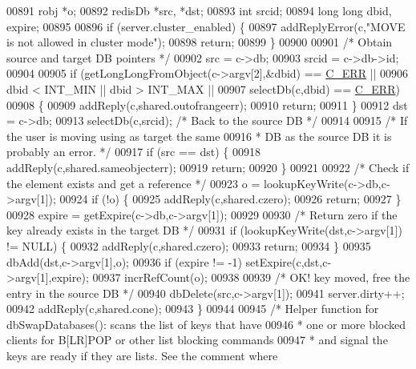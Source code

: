 \begin{DoxyCode}
00891     robj *o;
00892     redisDb *src, *dst;
00893     \textcolor{keywordtype}{int} srcid;
00894     \textcolor{keywordtype}{long} \textcolor{keywordtype}{long} dbid, expire;
00895 
00896     \textcolor{keywordflow}{if} (server.cluster\_enabled) \{
00897         addReplyError(c,\textcolor{stringliteral}{"MOVE is not allowed in cluster mode"});
00898         \textcolor{keywordflow}{return};
00899     \}
00900 
00901     \textcolor{comment}{/* Obtain source and target DB pointers */}
00902     src = c->db;
00903     srcid = c->db->id;
00904 
00905     \textcolor{keywordflow}{if} (getLongLongFromObject(c->argv[2],&dbid) == \hyperlink{server_8h_af98ac28d5f4d23d7ed5985188e6fb7d1}{C\_ERR} ||
00906         dbid < INT\_MIN || dbid > INT\_MAX ||
00907         selectDb(c,dbid) == \hyperlink{server_8h_af98ac28d5f4d23d7ed5985188e6fb7d1}{C\_ERR})
00908     \{
00909         addReply(c,shared.outofrangeerr);
00910         \textcolor{keywordflow}{return};
00911     \}
00912     dst = c->db;
00913     selectDb(c,srcid); \textcolor{comment}{/* Back to the source DB */}
00914 
00915     \textcolor{comment}{/* If the user is moving using as target the same}
00916 \textcolor{comment}{     * DB as the source DB it is probably an error. */}
00917     \textcolor{keywordflow}{if} (src == dst) \{
00918         addReply(c,shared.sameobjecterr);
00919         \textcolor{keywordflow}{return};
00920     \}
00921 
00922     \textcolor{comment}{/* Check if the element exists and get a reference */}
00923     o = lookupKeyWrite(c->db,c->argv[1]);
00924     \textcolor{keywordflow}{if} (!o) \{
00925         addReply(c,shared.czero);
00926         \textcolor{keywordflow}{return};
00927     \}
00928     expire = getExpire(c->db,c->argv[1]);
00929 
00930     \textcolor{comment}{/* Return zero if the key already exists in the target DB */}
00931     \textcolor{keywordflow}{if} (lookupKeyWrite(dst,c->argv[1]) != NULL) \{
00932         addReply(c,shared.czero);
00933         \textcolor{keywordflow}{return};
00934     \}
00935     dbAdd(dst,c->argv[1],o);
00936     \textcolor{keywordflow}{if} (expire != -1) setExpire(c,dst,c->argv[1],expire);
00937     incrRefCount(o);
00938 
00939     \textcolor{comment}{/* OK! key moved, free the entry in the source DB */}
00940     dbDelete(src,c->argv[1]);
00941     server.dirty++;
00942     addReply(c,shared.cone);
00943 \}
00944 
00945 \textcolor{comment}{/* Helper function for dbSwapDatabases(): scans the list of keys that have}
00946 \textcolor{comment}{ * one or more blocked clients for B[LR]POP or other list blocking commands}
00947 \textcolor{comment}{ * and signal the keys are ready if they are lists. See the comment where}

\end{DoxyCode}
